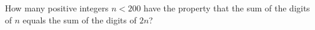 How many positive integers $n<200$ have the property that the sum of the digits of $n$ equals the sum of the digits of $2n$?
